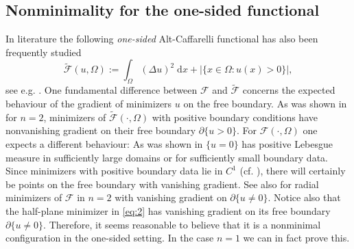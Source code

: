 \documentclass[twoside,11pt]{article}
\theoremstyle{definition}
\begin{document}
\subsection{Nonminimality for the one-sided functional}
In literature the following \emph{one-sided} Alt-Caffarelli functional has also been frequently studied
\begin{equation*}
    \tilde{\mathcal{F}}(u,\Omega) := \int_\Omega (\Delta u)^2 \; \mathrm{d}x + |\{ x \in \Omega: u(x) > 0 \}|  ,
\end{equation*}
see e.g. \cite{DKV19,DKV20}.
One fundamental difference between $\mathcal{F}$ and $\tilde{\mathcal{F}}$ concerns the expected behaviour of the gradient of minimizers $u$ on the free boundary. 
As was  shown in \cite[Theorem 1.4]{MuellerAMPA} for $n=2$,  minimizers of $\tilde{\mathcal{F}}(\cdot, \Omega)$ with positive boundary conditions have nonvanishing gradient on their free boundary $\partial \{ u > 0 \}$. For $\mathcal{F}(\cdot, \Omega)$ one expects a different behaviour: As was shown in \cite[Theorem 3]{GMMathAnn} $\{ u = 0 \}$ has  positive Lebesgue measure in sufficiently large domains or for sufficiently small boundary data. 
Since minimizers with positive boundary data lie in $C^1$ (cf.  \cite[Theorem 2]{GMMathAnn}), there will certainly be points on the free boundary with vanishing gradient. See also \cite[Examples 2 and 4]{GMMathAnn} for radial minimizers of $\mathcal{F}$ in $n=2$ with vanishing gradient on $\partial \{ u \neq 0 \}$. Notice also that the half-plane minimizer in \eqref{eq:2} has vanishing gradient on its free boundary  $\partial \{ u \neq 0 \}$. Therefore, it seems reasonable to believe that it is a nonminimal configuration in the one-sided setting. In the case $n= 1$ we can in fact prove this. 
\end{document}
